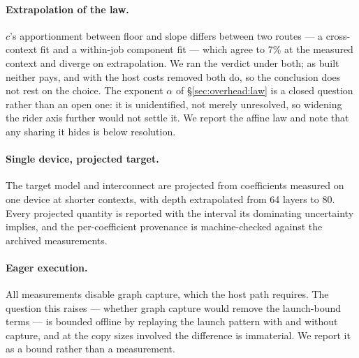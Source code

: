 \paragraph{Extrapolation of the law.} $c$'s apportionment between floor and
slope differs between two routes --- a cross-context fit and a within-job
component fit --- which agree to 7\% at the measured context and diverge on
extrapolation. We ran the verdict under both; as built neither pays, and with
the host costs removed both do, so the conclusion does not rest on the choice.
The exponent $\alpha$ of \S\ref{sec:overhead:law} is a closed question rather
than an open one: it is unidentified, not merely unresolved, so widening the
rider axis further would not settle it. We report the affine law and note that
any sharing it hides is below resolution.

\paragraph{Single device, projected target.} The target model and interconnect
are projected from coefficients measured on one device at shorter contexts, with
depth extrapolated from 64 layers to 80. Every projected quantity is reported
with the interval its dominating uncertainty implies, and the per-coefficient
provenance is machine-checked against the archived measurements.

\paragraph{Eager execution.} All measurements disable graph capture, which the
host path requires. The question this raises --- whether graph capture would
remove the launch-bound terms --- is bounded offline by replaying the launch
pattern with and without capture, and at the copy sizes involved the difference
is immaterial. We report it as a bound rather than a measurement.
